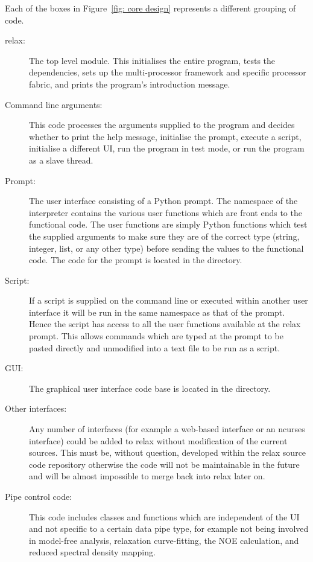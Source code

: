Each of the boxes in Figure~\ref{fig: core design} represents a different grouping of code.
\begin{description}
  \item[relax:]  The top level module.
    This initialises the entire program, tests the dependencies, sets up the multi-processor framework and specific processor fabric, and prints the program's introduction message.
  \item[Command line arguments:]  This code processes the arguments supplied to the program and decides whether to print the help message, initialise the prompt, execute a script, initialise a different UI, run the program in test mode, or run the program as a slave thread.
  \item[Prompt:]  The user interface consisting of a Python prompt.
    The namespace of the interpreter contains the various user functions which are front ends to the functional code.
    The user functions are simply Python functions which test the supplied arguments to make sure they are of the correct type (string, integer, list, or any other type) before sending the values to the functional code.
    The code for the prompt is located in the  directory.
  \item[Script:]  If a script is supplied on the command line or executed within another user interface it will be run in the same namespace as that of the prompt.
    Hence the script has access to all the user functions available at the relax prompt.
    This allows commands which are typed at the prompt to be pasted directly and unmodified into a text file to be run as a script.
  \item[GUI:]  The graphical user interface code base is located in the  directory.
  \item[Other interfaces:]  Any number of interfaces (for example a web-based interface or an ncurses interface) could be added to relax without modification of the current sources.
    This must be, without question, developed within the relax source code repository otherwise the code will not be maintainable in the future and will be almost impossible to merge back into relax later on.
  \item[Pipe control code:]  This code includes classes and functions which are independent of the UI and not specific to a certain data pipe type, for example not being involved in model-free analysis, relaxation curve-fitting, the NOE calculation, and reduced spectral density mapping.

\end{description}

